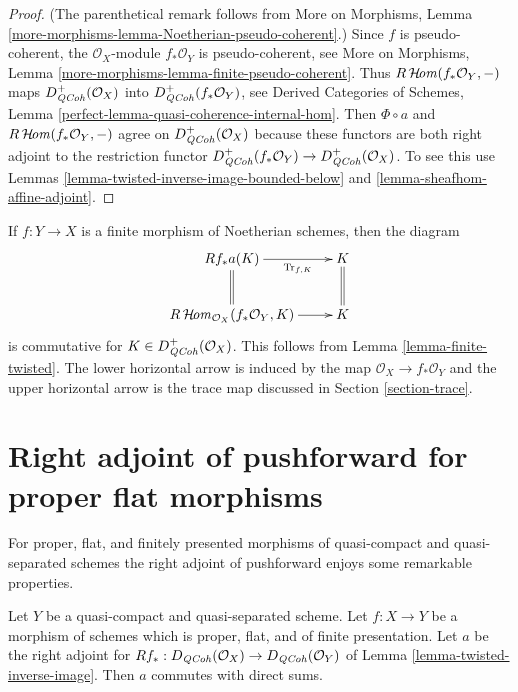 \begin{proof}
(The parenthetical remark follows from More on Morphisms, Lemma
\ref{more-morphisms-lemma-Noetherian-pseudo-coherent}.)
Since $f$ is pseudo-coherent, the $\mathcal{O}_X$-module $f_*\mathcal{O}_Y$
is pseudo-coherent, see More on Morphisms, Lemma
\ref{more-morphisms-lemma-finite-pseudo-coherent}.
Thus $R\mathop{\mathcal{H}\!\mathit{om}}\nolimits(f_*\mathcal{O}_Y, -)$ maps
$D_{\mathit{QCoh}}^+(\mathcal{O}_X)$ into
$D_{\mathit{QCoh}}^+(f_*\mathcal{O}_Y)$, see
Derived Categories of Schemes, Lemma
\ref{perfect-lemma-quasi-coherence-internal-hom}.
Then $\Phi \circ a$ and $R\mathop{\mathcal{H}\!\mathit{om}}\nolimits(f_*\mathcal{O}_Y, -)$
agree on $D_{\mathit{QCoh}}^+(\mathcal{O}_X)$ because these functors are
both right adjoint to the restriction functor
$D_{\mathit{QCoh}}^+(f_*\mathcal{O}_Y) \to D_{\mathit{QCoh}}^+(\mathcal{O}_X)$. To see this
use Lemmas \ref{lemma-twisted-inverse-image-bounded-below} and
\ref{lemma-sheafhom-affine-adjoint}.
\end{proof}

\begin{remark}
\label{remark-trace-map-finite}
If $f : Y \to X$ is a finite morphism of Noetherian schemes, then the diagram
$$
\xymatrix{
Rf_*a(K) \ar[r]_-{\text{Tr}_{f, K}} \ar@{=}[d] & K \ar@{=}[d] \\
R\SheafHom_{\mathcal{O}_X}(f_*\mathcal{O}_Y, K) \ar[r] & K
}
$$
is commutative for $K \in D_{\mathit{QCoh}}^+(\mathcal{O}_X)$. This follows
from Lemma \ref{lemma-finite-twisted}. The lower horizontal
arrow is induced by the map $\mathcal{O}_X \to f_*\mathcal{O}_Y$ and the
upper horizontal arrow is the trace map discussed in
Section \ref{section-trace}.
\end{remark}






\section{Right adjoint of pushforward for proper flat morphisms}
\label{section-proper-flat}

\noindent
For proper, flat, and finitely presented morphisms of quasi-compact
and quasi-separated schemes the right adjoint of pushforward
enjoys some remarkable properties.

\begin{lemma}
\label{lemma-proper-flat}
Let $Y$ be a quasi-compact and quasi-separated scheme.
Let $f : X \to Y$ be a morphism of schemes which is proper, flat, and
of finite presentation.
Let $a$ be the right adjoint for
$Rf_* : D_{\mathit{QCoh}}(\mathcal{O}_X) \to D_{\mathit{QCoh}}(\mathcal{O}_Y)$ of
Lemma \ref{lemma-twisted-inverse-image}. Then $a$ commutes with direct sums.
\end{lemma}

